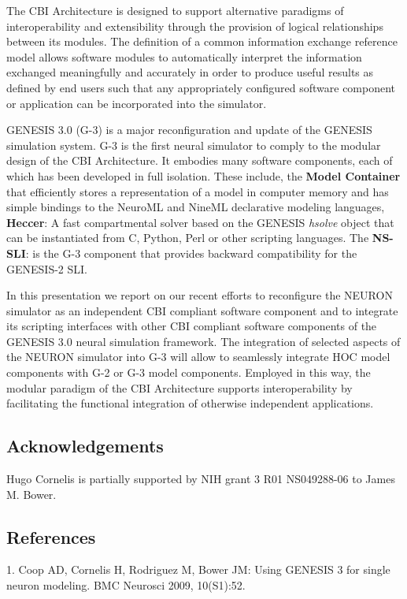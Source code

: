 \documentclass[12pt]{article}
\begin{document}
The CBI Architecture is designed to support alternative paradigms of interoperability and extensibility through the provision of logical relationships between its modules.  The definition of a common information exchange reference model allows software modules to automatically interpret the information exchanged meaningfully and accurately in order to produce useful results as defined by end users such that any appropriately configured software component or application can be incorporated into the simulator.

GENESIS 3.0 (G-3) is a major reconfiguration and update of the GENESIS simulation system.  G-3 is the first neural simulator to comply to the modular design of the CBI Architecture.  It embodies many software components, each of which has been developed in full isolation.  These include, the {\bf Model Container} that efficiently stores a representation of a model in computer memory and has simple bindings to the NeuroML and NineML declarative modeling languages, {\bf Heccer}: A fast compartmental solver based on the GENESIS {\it hsolve} object that can be instantiated from C, Python, Perl or other scripting languages.  The {\bf NS-SLI}: is the G-3 component that provides backward compatibility for the GENESIS-2 SLI.

In this presentation we report on our recent efforts to reconfigure the NEURON simulator as an independent CBI compliant software component and to integrate its scripting interfaces with other CBI compliant software components of the GENESIS 3.0 neural simulation framework.  The integration of selected aspects of the NEURON simulator into G-3 will allow to seamlessly integrate HOC model components with G-2 or G-3 model components.  Employed in this way, the modular paradigm of the CBI Architecture supports interoperability by facilitating the functional integration of otherwise independent applications.


\subsection*{Acknowledgements}
Hugo Cornelis is partially supported by NIH grant 3 R01 NS049288-06 to
James M. Bower.


\subsection*{References}
1. Coop AD, Cornelis H, Rodriguez M, Bower JM: Using GENESIS 3 for single neuron modeling. BMC Neurosci 2009, 10(S1):52.


\end{document}
